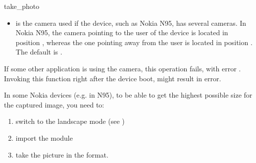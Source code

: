 \begin{funcdesc}{take_photo}{}
\begin{itemize}
	\begin{itemize}
	\item {} \newline
Sets white balance automatically. Default value, always supported
	\item {} \newline
Sets white balance to normal daylight
	\item {}' \newline
Sets white balance to overcast daylight
	\item {} \newline
Sets white balance to tungsten filament lighting
	\item {}' \newline
Sets white balance to fluorescent tube lighting
	\item {} \newline
Sets white balance to flash lighting
	\end{itemize}
\item {} is the camera used if the device, such as Nokia N95, has several cameras. In Nokia N95, the camera pointing to the user of the device is located in position , whereas the one pointing away from the user is located in position . The default  is .
\end{itemize}

If some other application is using the camera, this operation fails, with error 
. Invoking this function right after the device 
boot, might result in  error.

In some Nokia devices (e.g. in N95), to be able to get the highest possible size 
for the captured image, you need to:

\begin{enumerate}
\item switch to the landscape mode (see )
\item import the  module
\item take the picture in the  format.
\end{enumerate}

\item

\end{funcdesc}


